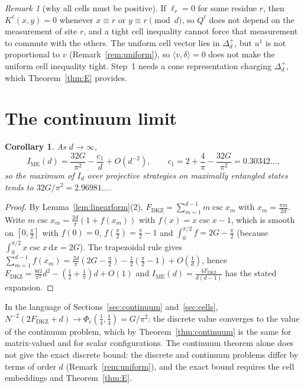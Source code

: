 \documentclass[11pt]{amsart}
\newtheorem{corollary}[theorem]{Corollary}
\theoremstyle{definition}
\theoremstyle{remark}
\newtheorem{remark}[theorem]{Remark}
\numberwithin{equation}{section}
\newcommand{\FD}{F_{\mathrm{DKZ}}}
\newcommand{\IME}{I_{\mathrm{ME}}}
\newcommand{\ip}[2]{\langle #1,#2\rangle}
\newcommand{\Phic}{\Phi_{\mathrm c}}
\newcommand{\dd}{\,\mathrm{d}}
\begin{document}
\begin{remark}[why all cells must be positive]\label{rem:positivecells}
If $\ell_r=0$ for some residue $r$, then $K^\ell(x,y)=0$ whenever $x\equiv r$ or $y\equiv r\pmod d$, so $Q^\ell$ does not depend on the
measurement of site $r$, and a tight cell inequality cannot force that measurement to commute with the others. The
uniform cell vector lies in $\Delta_d^+$, but $u^1$ is not proportional to $v$ (Remark~\ref{rem:uniform}), so $\ip v\delta=0$ does
not make the uniform cell inequality tight. Step~1 needs a cone representation charging $\Delta_d^+$, which
Theorem~\ref{thm:E} provides.
\end{remark}

\section{The continuum limit}\label{sec:consequences}

\begin{corollary}\label{cor:limit}
As $d\to\infty$,
\[
\IME(d)=\frac{32G}{\pi^2}-\frac{c_1}d+O(d^{-2}),\qquad c_1=2+\frac4\pi-\frac{32G}{\pi^2}=0.30342\ldots,
\]
so the maximum of $I_d$ over projective strategies on maximally entangled states tends to $32G/\pi^2=2.96981\ldots$.
\end{corollary}

\begin{proof}
By Lemma~\ref{lem:linearform}(2), $\FD=\sum_{m=1}^{d-1}m\csc x_m$ with $x_m=\frac{\pi m}{2d}$. Write
$m\csc x_m=\frac{2d}\pi(1+f(x_m))$ with $f(x)=x\csc x-1$, which is smooth on $[0,\frac\pi2]$ with $f(0)=0$, $f(\frac\pi2)=\frac\pi2-1$ and
$\int_0^{\pi/2}f=2G-\frac\pi2$ (because $\int_0^{\pi/2}x\csc x\dd x=2G$). The trapezoidal rule gives
$\sum_{m=1}^{d-1}f(x_m)=\frac{2d}\pi(2G-\frac\pi2)-\frac12(\frac\pi2-1)+O(\frac1d)$, hence
$\FD=\frac{8G}{\pi^2}d^2-(\frac12+\frac1\pi)d+O(1)$ and $\IME(d)=\frac{4\FD}{d(d-1)}$ has the stated expansion.
\end{proof}

In the language of Sections~\ref{sec:continuum} and~\ref{sec:cells}, $N^{-2}(2\FD+d)\to\Phic(\frac14,\frac14)=G/\pi^2$: the
discrete value converges to the value of the continuum problem, which by Theorem~\ref{thm:continuum} is the same for
matrix-valued and for scalar configurations. The continuum theorem alone does not give the exact discrete bound: the
discrete and continuum problems differ by terms of order $d$ (Remark~\ref{rem:uniform}), and the exact bound requires
the cell embeddings and Theorem~\ref{thm:E}.
\end{document}
